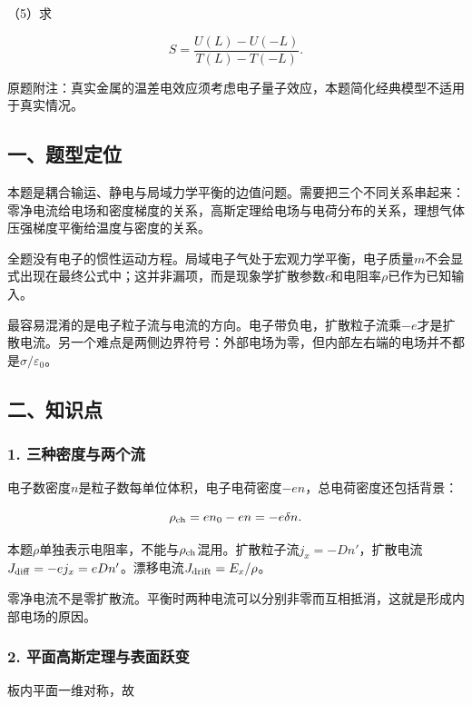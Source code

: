 \documentclass[12pt,a4paper,fontset=fandol]{ctexart}
\begin{document}
（5）求

\[
S=\frac{U(L)-U(-L)}{T(L)-T(-L)}.
\]

原题附注：真实金属的温差电效应须考虑电子量子效应，本题简化经典模型不适用于真实情况。

\subsection{一、题型定位}\label{ux4e00ux9898ux578bux5b9aux4f4d-5}

本题是耦合输运、静电与局域力学平衡的边值问题。需要把三个不同关系串起来：零净电流给电场和密度梯度的关系，高斯定理给电场与电荷分布的关系，理想气体压强梯度平衡给温度与密度的关系。

全题没有电子的惯性运动方程。局域电子气处于宏观力学平衡，电子质量\(m\)不会显式出现在最终公式中；这并非漏项，而是现象学扩散参数\(c\)和电阻率\(\rho\)已作为已知输入。

最容易混淆的是电子粒子流与电流的方向。电子带负电，扩散粒子流乘\(-e\)才是扩散电流。另一个难点是两侧边界符号：外部电场为零，但内部左右端的电场并不都是\(\sigma/\varepsilon_0\)。

\subsection{二、知识点}\label{ux4e8cux77e5ux8bc6ux70b9-5}

\subsubsection{1.
三种密度与两个流}\label{ux4e09ux79cdux5bc6ux5ea6ux4e0eux4e24ux4e2aux6d41}

电子数密度\(n\)是粒子数每单位体积，电子电荷密度\(-en\)，总电荷密度还包括背景：

\[
\rho_{\rm ch}=en_0-en=-e\delta n.
\]

本题\(\rho\)单独表示电阻率，不能与\(\rho_{\rm ch}\)混用。扩散粒子流\(j_x=-Dn'\)，扩散电流\(J_{\rm diff}=-ej_x=eDn'\)。漂移电流\(J_{\rm drift}=E_x/\rho\)。

零净电流不是零扩散流。平衡时两种电流可以分别非零而互相抵消，这就是形成内部电场的原因。

\subsubsection{2.
平面高斯定理与表面跃变}\label{ux5e73ux9762ux9ad8ux65afux5b9aux7406ux4e0eux8868ux9762ux8dc3ux53d8}

板内平面一维对称，故
\end{document}
